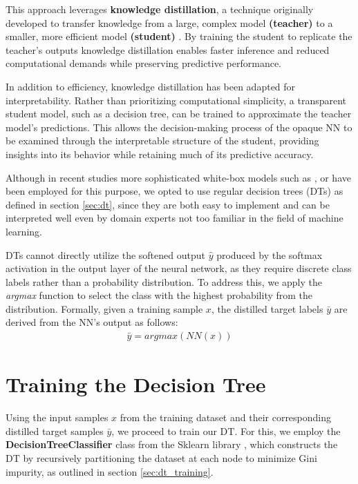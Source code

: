 This approach leverages \textbf{knowledge distillation},
a technique originally developed to transfer knowledge from a large,
complex model \textbf{(teacher)} to a smaller,
more efficient model \textbf{(student)} \cite{knowledge_distillation}.
By training the student to replicate the teacher's outputs
knowledge distillation enables faster inference and reduced computational demands
while preserving predictive performance.

In addition to efficiency, knowledge distillation has been adapted for interpretability.
Rather than prioritizing computational simplicity,
a transparent student model, such as a decision tree,
can be trained to approximate the teacher model's predictions.
This allows the decision-making process of the opaque NN
to be examined through the interpretable structure of the student,
providing insights into its behavior while retaining much of its predictive accuracy.

Although in recent studies more sophisticated white-box models
such as \cite{}, or \cite{} have been employed for this purpose,
we opted to use regular decision trees (DTs) as defined in section \ref{sec:dt},
since they are both easy to implement and can be interpreted well
even by domain experts not too familiar in the field of machine learning.

DTs cannot directly utilize the softened output $\hat{y}$ produced by the softmax activation
in the output layer of the neural network,
as they require discrete class labels rather than a probability distribution.
To address this, we apply the \textit{argmax} function to select the class
with the highest probability from the distribution.
Formally, given a training sample $x$,
the distilled target labels $\bar{y}$ are derived from the NN's output as follows:
\begin{align}
    \bar{y} = \textit{argmax}(\textit{NN}(x))
\end{align}


\section{Training the Decision Tree}
Using the input samples $x$ from the training dataset
and their corresponding distilled target samples $\bar{y}$, we proceed to train our DT.
For this, we employ the \textbf{DecisionTreeClassifier} class from the Sklearn library \cite{sklearn},
which constructs the DT by recursively partitioning the dataset at each node to minimize Gini impurity,
as outlined in section \ref{sec:dt_training}.

